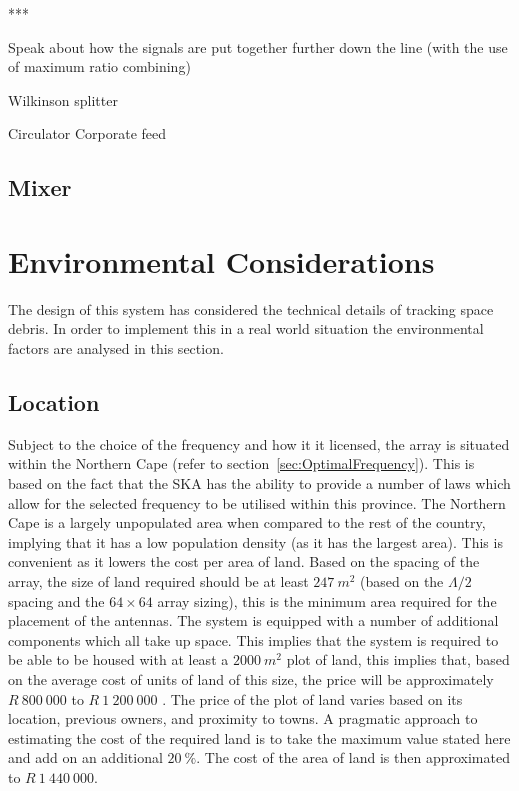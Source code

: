 \documentclass[11pt]{witseiepaper}
\begin{document}
***

Speak about how the signals are put together further down the line (with the use of maximum ratio combining)

Wilkinson splitter

Circulator
Corporate feed

\subsection{Mixer} \label{sec:Mixer}


\section{Environmental Considerations} \label{sec:EnvironmentalConsiderations}
The design of this system has considered the technical details of tracking space debris. In order to implement this in a real world situation the environmental factors are analysed in this section.

\subsection{Location} \label{sec:Location}
Subject to the choice of the frequency and how it it licensed, the array is situated within the Northern Cape (refer to section~\ref{sec:OptimalFrequency}). This is based on the fact that the SKA has the ability to provide a number of laws which allow for the selected frequency to be utilised within this province.
The Northern Cape is a largely unpopulated area when compared to the rest of the country, implying that it has a low population density (as it has the largest area). This is convenient as it lowers the cost per area of land. 
Based on the spacing of the array, the size of land required should be at least $247~m^2$ (based on the $\Lambda/2$ spacing and the $64 \times 64$ array sizing), this is the minimum area required for the placement of the antennas. The system is equipped with a number of additional components which all take up space.
This implies that the system is required to be able to be housed with at least a $2000~m^2$ plot of land, this implies that, based on the average cost of units of land of this size, the price will be approximately $R~800~000$ to $R~1~200~000$ \cite{LocationPrice1, LocationPrice2, LocationPrice3}.
The price of the plot of land varies based on its location, previous owners, and proximity to towns. A pragmatic approach to estimating the cost of the required land is to take the maximum value stated here and add on an additional $20~\%$. The cost of the area of land is then approximated to $R~1~440~000$.
\end{document}
